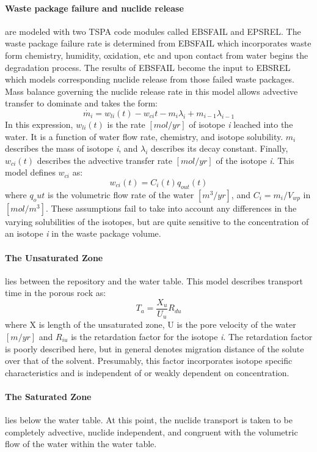 \paragraph{Waste package failure and nuclide release} are modeled with two TSPA code modules called EBSFAIL and EPSREL. The waste package failure rate is determined from EBSFAIL which incorporates waste form chemistry, humidity, oxidation, etc and upon contact from water begins the degradation process. The results of EBSFAIL become the input to EBSREL which models corresponding nuclide release from those failed waste packages. Mass balance governing the nuclide release rate in this model allows advective transfer to dominate and takes the form:
\begin{equation}
\dot{m_i}=w_{li}(t)-w_{ci}{t}-m_i\lambda_i+m_{i-1}\lambda_{i-1}\nonumber
\end{equation}
In this expression, $w_{li}(t)$ is the rate $[mol/yr]$ of isotope \emph{i} leached into the water. It is a function of water flow rate, chemistry, and isotope solubility. $m_i$ describes the mass of isotope \emph{i}, and $\lambda_i$ describes its decay constant. Finally, $w_{ci}(t)$ describes the advective transfer rate $[mol/yr]$ of the isotope \emph{i}. This model defines $w_{ci}$ as:
\begin{equation}
w_{ci}(t)=C_i(t)q_{out}(t)
\end{equation} 
where $q_out$ is the volumetric flow rate of the water $[m^3/yr]$, and $C_i = m_i/V_{wp}$ in $[mol/m^3]$. These assumptions fail to take into account any differences in the varying solubilities of the isotopes, but are quite sensitive to the concentration of an isotope \emph{i} in the waste package volume. 
\paragraph{The Unsaturated Zone} lies between the repository and the water table. This model describes transport time in the porous rock as:
\begin{equation}
T_a= \frac{X_u}{U_u}R_{du}
\end{equation}
where X is length of the unsaturated zone, U is the pore velocity of the water $[m/yr]$ and $R_{iu}$ is the retardation factor for the isotope \emph{i}. The retardation factor is poorly described here, but in general denotes migration distance of the solute over that of the solvent. Presumably, this factor incorporates isotope specific characteristics and is independent of or weakly dependent on concentration. 
\paragraph{The Saturated Zone} lies below the water table. At this point, the nuclide transport is taken to be completely advective, nuclide independent, and congruent with the volumetric flow of the water within the water table. 

